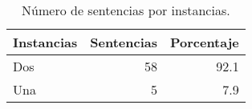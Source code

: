 \begin{table}[H]
\centering
\caption{Número de sentencias por instancias.} 
\label{tab:instancia}
\begin{tabular}{lrr}
  \hline
Instancias & Sentencias & Porcentaje \\ 
  \hline
Dos & 58 & 92.1 \\ 
  Una &  5 & 7.9 \\ 
   \hline
\end{tabular}
\end{table}
